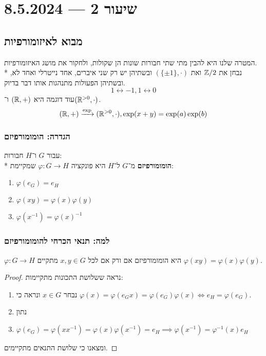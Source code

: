 \section{שיעור 2 --- 8.5.2024}
\subsection{מבוא לאיזומורפיות}
המטרה שלנו היא להבין מתי שתי חבורות שונות הן שקולות, ולחקור את מושג האיזומורפיות. \\*
נבחן את $\mathbb{Z}/2$ ואת $(\{\pm 1\}, \cdot)$ ובשתיהן יש רק שני איברים, אחד נייטרלי ואחד לא, ובשתיהן הפעולות מתנהגות אותו דבר בדיוק.
\[
	1 \leftrightarrow -1,
	1 \leftrightarrow 0
\]
עוד דוגמה היא $(\mathbb{R}, +)$ ו־$(\mathbb{R}^{>0}, \cdot)$.
\[
	(\mathbb{R}, +) \xrightarrow{\exp} (\mathbb{R}^{>0}, \cdot), \exp(x + y) = \exp(a) \exp(b)
\]
\subsubsection{הגדרה: הומומורפיזם}
עבור $G$ ו־$H$ חבורות: \\*
\textbf{הומומורפיזם} מ־$G$ ל־$H$ היא פונקציה $\varphi : G \to H$ שמקיימת:
\begin{enumerate}
	\item $\varphi(e_G) = e_H$
	\item $\varphi(x y) = \varphi(x) \varphi(y)$
	\item $\varphi(x^{-1}) = {\varphi(x)}^{-1}$
\end{enumerate}

\subsubsection{למה: תנאי הכרחי להומומורפיזם}
$\varphi : G \to H$ היא הומומורפיזם אם ורק אם לכל $x, y \in G$ מתקיים $\varphi(xy) = \varphi(x) \varphi(y)$.
\begin{proof}
	נראה ששלושת התכונות מתקיימות:
	\begin{enumerate}
		\item נבחר $x \in G$ ונראה כי $\varphi(x) = \varphi(e_G x) = \varphi(e_G) \varphi(x) \iff e_H = \varphi(e_G)$.
		\item נתון
		\item $\varphi(e_G) = \varphi(x x^{-1}) = \varphi(x) \varphi(x^{-1}) = e_H \implies \varphi(x^{-1}) = \varphi^{-1}(x) e_H$
	\end{enumerate}
	ומצאנו כי שלושת התנאים מתקיימים.
\end{proof}

